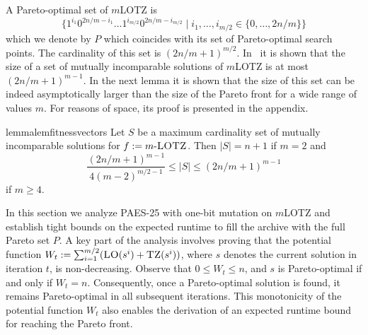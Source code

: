 \documentclass[
sigconf = false, %
review = false, %
screen = true, %
anonymous = true, %
format=acmsmall
]{acmart}
\newcommand{\mLOTZ}{\ensuremath{m}\text{-}\textsc{LOTZ}\xspace}
\newcommand{\LO}{\textsc{LO}\xspace}                      %
\newcommand{\TZ}{\textsc{TZ}\xspace}
\newcommand{\PAES}{PAES-25\xspace}
\newcommand{\nbc}[3]{
		{\colorbox{#3}{\bfseries\sffamily\scriptsize\textcolor{white}{#1}}}
		{\textcolor{#3}{\sf\small$\blacktriangleright$\textit{#2}$\blacktriangleleft$}}
}
\newcommand{\todo}[1]{\nbc{TODO}{#1}{red!70!black}}
\begin{document}
A Pareto-optimal set of \mLOTZ is
\[
\{1^{i_1}0^{2n/m-i_1} \ldots 1^{i_{m/2}}0^{2n/m-i_{m/2}} \mid i_1, \ldots , i_{m/2} \in \{0, \ldots , 2n/m\}\}
\]
which we denote by $P$ which coincides with its set of Pareto-optimal search points. The cardinality of this set is $(2n/m+1)^{m/2}$. In~\cite{OprisNSGAIII} it is shown that the size of a set of mutually incomparable solutions of \mLOTZ is at most $(2n/m+1)^{m-1}$. In the next lemma it is shown that the size of this set can be indeed asymptotically larger than the size of the Pareto front for a wide range of values $m$. For reasons of space, its proof is presented in the appendix. 

\begin{restatable}{lemma}{lemfitnessvectors}
\label{lem:fitnessvectors-non-dom-LOTZ}
    Let $S$ be a maximum cardinality set of mutually incomparable solutions for $f:=\mLOTZ$. Then $|S| = n+1$ if $m=2$ and 
    $$\frac{(2n/m + 1)^{m-1}}{4(m-2)^{m/2-1}} \leq \lvert{S}\rvert \leq (2n/m+1)^{m-1}$$
    if $m \geq 4$.
\end{restatable}


In this section we analyze \PAES with one-bit mutation on \mLOTZ and establish tight bounds on the expected runtime to fill the archive with the full Pareto set $P$. A key part of the analysis involves proving that the potential function $W_t:=\sum_{i=1}^{m/2} (\LO(s^i) + \TZ(s^i))$, where $s$ denotes the current solution in iteration $t$, is non-decreasing. Observe that $0 \leq W_t \leq n$, and $s$ is Pareto-optimal if and only if $W_t=n$. Consequently, once a Pareto-optimal solution is found, it remains Pareto-optimal in all subsequent iterations. This monotonicity of the potential function $W_t$ also enables the derivation of an expected runtime bound for reaching the Pareto front.
\end{document}
